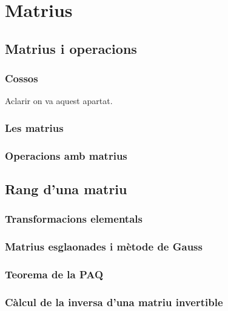 \documentclass[../Apunts.tex]{subfiles}
\begin{document}
\chapter{Matrius}
\section{Matrius i operacions}
\subsection{Cossos}
	\begin{definition}[Cos]
		Aclarir on va aquest apartat.
	\end{definition}
\subsection{Les matrius}
	\begin{definition}[Matriu]
	\end{definition}
	\begin{definition}
	\end{definition}
	\begin{definition}
	\end{definition}
	\begin{definition}
	\end{definition}
\subsection{Operacions amb matrius}
\section{Rang d'una matriu}
\subsection{Transformacions elementals}
\subsection{Matrius esglaonades i mètode de Gauss}
\subsection{Teorema de la PAQ}
\subsection{Càlcul de la inversa d'una matriu invertible}
\end{document}
